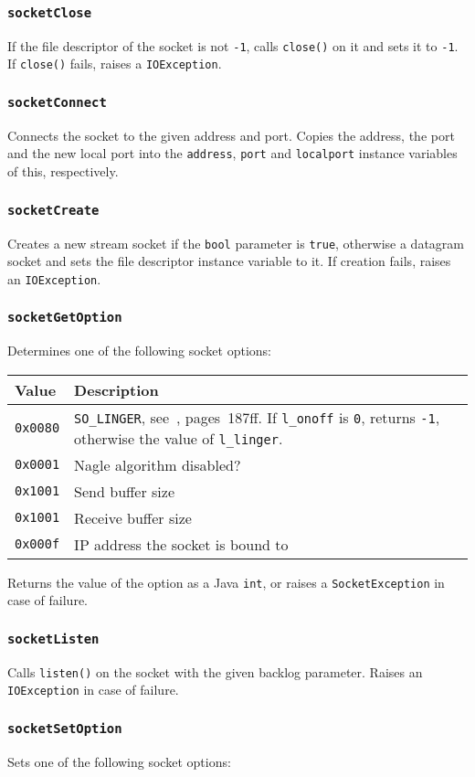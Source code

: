 \documentclass[twocolumn,a4paper]{article}      %
\newcommand{\method}[1]{\subsubsection*{\texttt{#1}}}
\begin{document}
\method{socketClose}

If the file descriptor of the socket is not \texttt{-1}, calls
\texttt{close()} on it and sets it to \texttt{-1}. If \texttt{close()}
fails, raises a \texttt{IOException}.

\method{socketConnect}

Connects the socket to the given address and port. Copies the address,
the port and the new local port into the \texttt{address},
\texttt{port} and \texttt{localport} instance variables of this,
respectively.

\method{socketCreate}

Creates a new stream socket if the \texttt{bool} parameter is
\texttt{true}, otherwise a datagram socket and sets the file
descriptor instance variable to it. If creation fails, raises an
\texttt{IOException}.

\method{socketGetOption}

Determines one of the following socket options:

\medskip
\begin{tabular}{|l|p{5cm}|} \hline
Value           & Description \\ \hline
\texttt{0x0080} & \texttt{SO\_LINGER}, see~\cite{stevens1}, pages~187ff.
                  If \texttt{l\_onoff} is \texttt{0}, returns \texttt{-1},
                  otherwise the value of \texttt{l\_linger}. \\
\texttt{0x0001} & Nagle algorithm disabled? \\
\texttt{0x1001} & Send buffer size \\
\texttt{0x1001} & Receive buffer size \\
\texttt{0x000f} & IP address the socket is bound to \\ \hline
\end{tabular}
\medskip

Returns the value of the option as a Java \texttt{int}, or raises a
\texttt{SocketException} in case of failure.

\method{socketListen}

Calls \texttt{listen()} on the socket with the given backlog
parameter. Raises an \texttt{IOException} in case of failure.

\method{socketSetOption}

Sets one of the following socket options:
\end{document}
